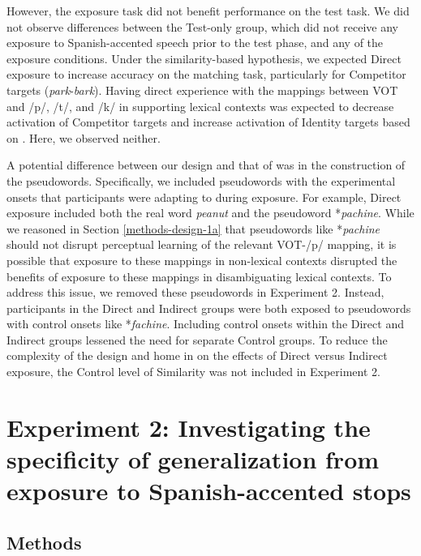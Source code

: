 \documentclass[preprint, 3p, authoryear]{elsarticle} %
\begin{document}
However, the exposure task did not benefit performance on the test task.
We did not observe differences between the Test-only group, which did not receive any exposure to Spanish-accented speech prior to the test phase, and any of the exposure conditions.
Under the similarity-based hypothesis, we expected Direct exposure to increase accuracy on the matching task, particularly for Competitor targets (\emph{park}-\emph{bark}).
Having direct experience with the mappings between VOT and /p/, /t/, and /k/ in supporting lexical contexts was expected to decrease activation of Competitor targets and increase activation of Identity targets based on \citet{xie2017similarity}.
Here, we observed neither.

A potential difference between our design and that of \citet{xie2017similarity} was in the construction of the pseudowords.
Specifically, we included pseudowords with the experimental onsets that participants were adapting to during exposure.
For example, Direct exposure included both the real word \emph{peanut} and the pseudoword *\emph{pachine}.
While we reasoned in Section \ref{methods-design-1a} that pseudowords like *\emph{pachine} should not disrupt perceptual learning of the relevant VOT-/p/ mapping, it is possible that exposure to these mappings in non-lexical contexts disrupted the benefits of exposure to these mappings in disambiguating lexical contexts.
To address this issue, we removed these pseudowords in Experiment 2.
Instead, participants in the Direct and Indirect groups were both exposed to pseudowords with control onsets like *\emph{fachine}.
Including control onsets within the Direct and Indirect groups lessened the need for separate Control groups.
To reduce the complexity of the design and home in on the effects of Direct versus Indirect exposure, the Control level of Similarity was not included in Experiment 2.

\hypertarget{experiment-2-investigating-the-specificity-of-generalization-from-exposure-to-spanish-accented-stops}{%
\section{Experiment 2: Investigating the specificity of generalization from exposure to Spanish-accented stops}\label{experiment-2-investigating-the-specificity-of-generalization-from-exposure-to-spanish-accented-stops}}

\hypertarget{methods-1}{%
\subsection{Methods}\label{methods-1}}
\end{document}
